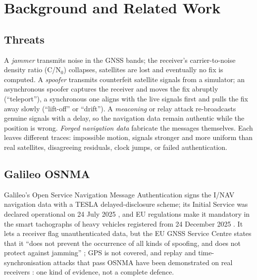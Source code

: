 \documentclass[conference]{IEEEtran}
\begin{document}
\section{Background and Related Work}\label{sec:related}

\subsection{Threats}
A \emph{jammer} transmits noise in the GNSS bands; the receiver's carrier-to-noise density ratio (C/N$_0$) collapses, satellites are lost and eventually no fix is computed. A \emph{spoofer} transmits counterfeit satellite signals from a simulator; an asynchronous spoofer captures the receiver and moves the fix abruptly (``teleport''), a synchronous one aligns with the live signals first and pulls the fix away slowly (``lift-off'' or ``drift''). A \emph{meaconing} or relay attack re-broadcasts genuine signals with a delay, so the navigation data remain authentic while the position is wrong. \emph{Forged navigation data} fabricate the messages themselves. Each leaves different traces: impossible motion, signals stronger and more uniform than real satellites, disagreeing residuals, clock jumps, or failed authentication.

\subsection{Galileo OSNMA}
Galileo's Open Service Navigation Message Authentication signs the I/NAV navigation data with a TESLA delayed-disclosure scheme; its Initial Service was declared operational on 24 July 2025 \cite{euspa2025}, and EU regulations make it mandatory in the smart tachographs of heavy vehicles registered from 24 December 2025 \cite{eu2023980}. It lets a receiver flag unauthenticated data, but the EU GNSS Service Centre states that it ``does not prevent the occurrence of all kinds of spoofing, and does not protect against jamming'' \cite{gsc_faq}; GPS is not covered, and replay and time-synchronisation attacks that pass OSNMA have been demonstrated on real receivers \cite{wang2025}: one kind of evidence, not a complete defence.
\end{document}
